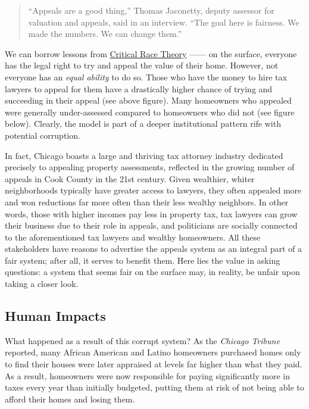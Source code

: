 \documentclass[
  letterpaper,
  DIV=11,
  numbers=noendperiod]{scrreprt}
\begin{document}
\begin{quote}
``Appeals are a good thing,'' Thomas Jaconetty, deputy assessor for
valuation and appeals, said in an interview. ``The goal here is
fairness. We made the numbers. We can change them.''
\end{quote}

We can borrow lessons from
\href{https://www.britannica.com/topic/critical-race-theory}{Critical
Race Theory} ------ on the surface, everyone has the legal right to try
and appeal the value of their home. However, not everyone has an
\emph{equal ability} to do so. Those who have the money to hire tax
lawyers to appeal for them have a drastically higher chance of trying
and succeeding in their appeal (see above figure). Many homeowners who
appealed were generally under-assessed compared to homeowners who did
not (see figure below). Clearly, the model is part of a deeper
institutional pattern rife with potential corruption.

In fact, Chicago boasts a large and thriving tax attorney industry
dedicated precisely to appealing property assessments, reflected in the
growing number of appeals in Cook County in the 21st century. Given
wealthier, whiter neighborhoods typically have greater access to
lawyers, they often appealed more and won reductions far more often than
their less wealthy neighbors. In other words, those with higher incomes
pay less in property tax, tax lawyers can grow their business due to
their role in appeals, and politicians are socially connected to the
aforementioned tax lawyers and wealthy homeowners. All these
stakeholders have reasons to advertise the appeals system as an integral
part of a fair system; after all, it serves to benefit them. Here lies
the value in asking questions: a system that seems fair on the surface
may, in reality, be unfair upon taking a closer look.

\subsection{Human Impacts}\label{human-impacts}

What happened as a result of this corrupt system? As the \emph{Chicago
Tribune} reported, many African American and Latino homeowners purchased
homes only to find their houses were later appraised at levels far
higher than what they paid. As a result, homeowners were now responsible
for paying significantly more in taxes every year than initially
budgeted, putting them at risk of not being able to afford their homes
and losing them.
\end{document}
